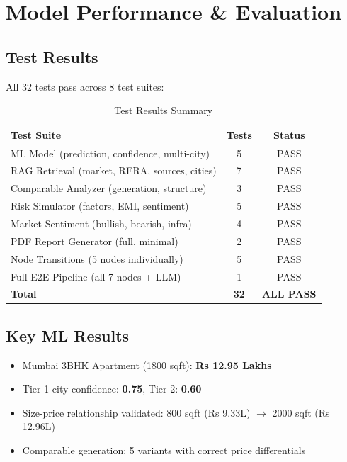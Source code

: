 \documentclass[12pt,a4paper]{article}
\begin{document}
\section{Model Performance \& Evaluation}

\subsection{Test Results}
All 32 tests pass across 8 test suites:

\begin{table}[H]\centering
\caption{Test Results Summary}
\begin{tabular}{@{}lcc@{}}
\toprule
\textbf{Test Suite} & \textbf{Tests} & \textbf{Status} \\
\midrule
ML Model (prediction, confidence, multi-city) & 5 & \textcolor{primary}{PASS} \\
RAG Retrieval (market, RERA, sources, cities) & 7 & \textcolor{primary}{PASS} \\
Comparable Analyzer (generation, structure) & 3 & \textcolor{primary}{PASS} \\
Risk Simulator (factors, EMI, sentiment) & 5 & \textcolor{primary}{PASS} \\
Market Sentiment (bullish, bearish, infra) & 4 & \textcolor{primary}{PASS} \\
PDF Report Generator (full, minimal) & 2 & \textcolor{primary}{PASS} \\
Node Transitions (5 nodes individually) & 5 & \textcolor{primary}{PASS} \\
Full E2E Pipeline (all 7 nodes + LLM) & 1 & \textcolor{primary}{PASS} \\
\midrule
\textbf{Total} & \textbf{32} & \textbf{ALL PASS} \\
\bottomrule
\end{tabular}
\end{table}

\subsection{Key ML Results}
\begin{itemize}[noitemsep]
    \item Mumbai 3BHK Apartment (1800 sqft): \textbf{Rs 12.95 Lakhs}
    \item Tier-1 city confidence: \textbf{0.75}, Tier-2: \textbf{0.60}
    \item Size-price relationship validated: 800 sqft (Rs 9.33L) $\rightarrow$ 2000 sqft (Rs 12.96L)
    \item Comparable generation: 5 variants with correct price differentials
\end{itemize}
\end{document}
